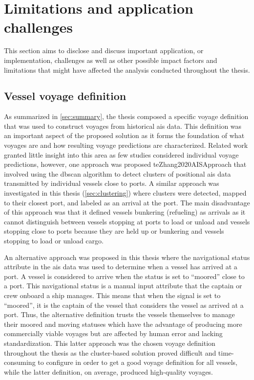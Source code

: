 \section{Limitations and application challenges}

This section aims to disclose and discuss important application, or implementation, challenges as well as other possible impact factors and limitations that might have affected the analysis conducted throughout the thesis.

\subsection{Vessel voyage definition}

As summarized in \cref{sec:summary}, the thesis composed a specific voyage definition that was used to construct voyages from historical \acrshort{ais} data. This definition was an important aspect of the proposed solution as it forms the foundation of what voyages are and how resulting voyage predictions are characterized. Related work granted little insight into this area as few studies considered individual voyage predictions, however, one approach was proposed te{Zhang2020AISApproach} that involved using the \acrshort{dbscan} algorithm to detect clusters of positional \acrshort{ais} data transmitted by individual vessels close to ports. A similar approach was investigated in this thesis (\cref{sec:clustering}) where clusters were detected, mapped to their closest port, and labeled as an arrival at the port. The main disadvantage of this approach was that it defined vessels bunkering (refueling) as arrivals as it cannot distinguish between vessels stopping at ports to load or unload and vessels stopping close to ports because they are held up or bunkering and vessels stopping to load or unload cargo.

An alternative approach was proposed in this thesis where the navigational status attribute in the \acrshort{ais} data was used to determine when a vessel has arrived at a port. A vessel is considered to arrive when the status is set to ``moored'' close to a port. This navigational status is a manual input attribute that the captain or crew onboard a ship manages. This means that when the signal is set to ``moored'', it is the captain of the vessel that considers the vessel as arrived at a port. Thus, the alternative definition trusts the vessels themselves to manage their moored and moving statuses which have the advantage of producing more commercially viable voyages but are affected by human error and lacking standardization. This latter approach was the chosen voyage definition throughout the thesis as the cluster-based solution proved difficult and time-consuming to configure in order to get a good voyage definition for all vessels, while the latter definition, on average, produced high-quality voyages.

